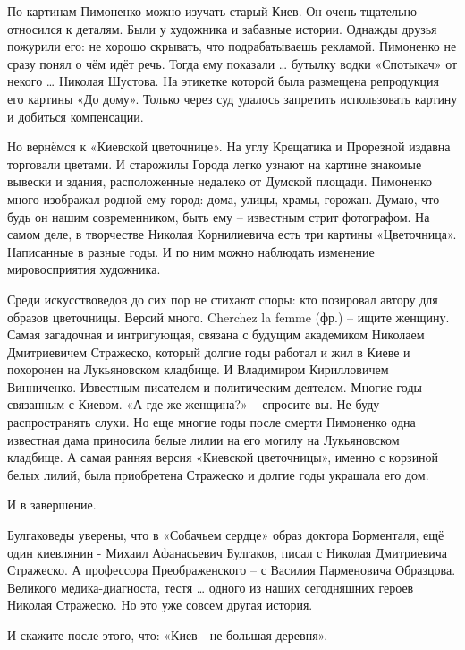 По картинам Пимоненко можно изучать старый Киев. Он очень тщательно относился к
деталям. Были у художника и забавные истории. Однажды друзья пожурили его: не
хорошо скрывать, что подрабатываешь рекламой. Пимоненко не сразу понял о чём
идёт речь. Тогда ему показали … бутылку водки «Спотыкач» от некого … Николая
Шустова. На этикетке которой была размещена репродукция его картины «До дому».
Только через суд удалось запретить использовать картину и добиться компенсации.

Но вернёмся к «Киевской цветочнице». На углу Крещатика и Прорезной издавна
торговали цветами. И старожилы Города легко узнают на картине знакомые вывески
и здания, расположенные недалеко от Думской площади. Пимоненко много изображал
родной ему город: дома, улицы, храмы, горожан. Думаю, что будь он нашим
современником, быть ему – известным стрит фотографом. На самом деле, в
творчестве Николая Корнилиевича есть три картины «Цветочница». Написанные в
разные годы. И по ним можно наблюдать изменение мировосприятия художника.

Среди искусствоведов до сих пор не стихают споры: кто позировал автору для
образов цветочницы. Версий много. Cherchez la femme (фр.) – ищите женщину.
Самая загадочная и интригующая, связана с будущим академиком Николаем
Дмитриевичем Стражеско, который долгие годы работал и жил в Киеве и похоронен
на Лукьяновском кладбище. И Владимиром Кирилловичем Винниченко. Известным
писателем и политическим деятелем. Многие годы связанным с Киевом. «А где же
женщина?» – спросите вы. Не буду распространять слухи. Но еще многие годы после
смерти Пимоненко одна известная дама приносила белые лилии на его могилу на
Лукьяновском кладбище. А самая ранняя версия «Киевской цветочницы», именно с
корзиной белых лилий, была приобретена Стражеско и долгие годы украшала его
дом.

И в завершение.

Булгаковеды уверены, что в «Собачьем сердце» образ доктора Борменталя, ещё один
киевлянин - Михаил Афанасьевич Булгаков, писал с Николая Дмитриевича Стражеско.
А профессора Преображенского – с Василия Парменовича Образцова. Великого
медика-диагноста, тестя … одного из наших сегодняшних героев Николая Стражеско.
Но это уже совсем другая история.

И скажите после этого, что: «Киев - не большая деревня».

